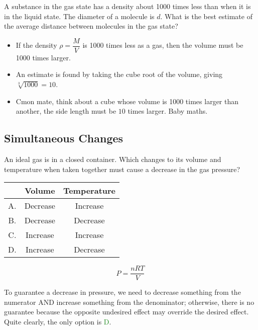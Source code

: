 \documentclass[a4paper,12pt]{article}
\newcommand{\lb}{\\[8pt]}
\begin{document}
A substance in the gas state has a density about 1000 times less than
when it is in the liquid state. The diameter of a molecule is $d$. What is the best estimate of the average distance between molecules in the gas state?

\begin{itemize}
  \item If the density $\rho = \dfrac{M}{V}$ is 1000 times less as a gas, then the volume must be 1000 times larger.
  \item An estimate is found by taking the cube root of the volume, giving $\sqrt[3]{1000} = 10$.
  \item Cmon mate, think about a cube whose volume is 1000 times larger than another, the side length must be $10$ times larger. Baby maths.
\end{itemize}

\pagebreak

\subsection{Simultaneous Changes}

An ideal gas is in a closed container. Which changes to its volume and temperature when taken together must cause a decrease in the gas
pressure?

\begin{table}[H]
  \centering
  \begin{tabular}{|c|c|c|}\hline
       & Volume   & Temperature \\ \hline
    A. & Decrease & Increase    \\ \hline
    B. & Decrease & Decrease    \\ \hline
    C. & Increase & Increase    \\ \hline
    D. & Increase & Decrease    \\ \hline
  \end{tabular}
\end{table}

$$P = \frac{nRT}{V}$$

To guarantee a decrease in pressure, we need to decrease something from the numerator AND increase something from the denominator; otherwise, there is no guarantee because the opposite undesired effect may override the desired effect.\lb
Quite clearly, the only option is \textcolor{ForestGreen}{D}.
\end{document}
